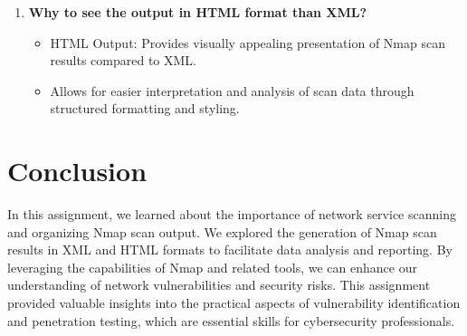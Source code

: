 \documentclass[11pt]{article}
\begin{document}
\begin{enumerate}
    \item \textbf{Why to see the output in HTML format than XML?}
          \begin{itemize}
              \item HTML Output: Provides visually appealing presentation of Nmap scan results compared to XML.
              \item Allows for easier interpretation and analysis of scan data through structured formatting and styling.
          \end{itemize}
\end{enumerate}


\section{Conclusion}
In this assignment, we learned about the importance of network service scanning and organizing Nmap scan output. We explored the generation of Nmap scan results in XML and HTML formats to facilitate data analysis and reporting. By leveraging the capabilities of Nmap and related tools, we can enhance our understanding of network vulnerabilities and security risks. This assignment provided valuable insights into the practical aspects of vulnerability identification and penetration testing, which are essential skills for cybersecurity professionals.
\clearpage

\pagebreak
\end{document}
